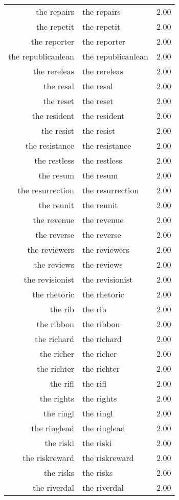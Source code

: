 \begin{table}[ht]
\begin{tabular}{rlr}
  the repairs & the repairs & 2.00 \\ 
  the repetit & the repetit & 2.00 \\ 
  the reporter & the reporter & 2.00 \\ 
  the republicanlean & the republicanlean & 2.00 \\ 
  the rereleas & the rereleas & 2.00 \\ 
  the resal & the resal & 2.00 \\ 
  the reset & the reset & 2.00 \\ 
  the resident & the resident & 2.00 \\ 
  the resist & the resist & 2.00 \\ 
  the resistance & the resistance & 2.00 \\ 
  the restless & the restless & 2.00 \\ 
  the resum & the resum & 2.00 \\ 
  the resurrection & the resurrection & 2.00 \\ 
  the reunit & the reunit & 2.00 \\ 
  the revenue & the revenue & 2.00 \\ 
  the reverse & the reverse & 2.00 \\ 
  the reviewers & the reviewers & 2.00 \\ 
  the reviews & the reviews & 2.00 \\ 
  the revisionist & the revisionist & 2.00 \\ 
  the rhetoric & the rhetoric & 2.00 \\ 
  the rib & the rib & 2.00 \\ 
  the ribbon & the ribbon & 2.00 \\ 
  the richard & the richard & 2.00 \\ 
  the richer & the richer & 2.00 \\ 
  the richter & the richter & 2.00 \\ 
  the rifl & the rifl & 2.00 \\ 
  the rights & the rights & 2.00 \\ 
  the ringl & the ringl & 2.00 \\ 
  the ringlead & the ringlead & 2.00 \\ 
  the riski & the riski & 2.00 \\ 
  the riskreward & the riskreward & 2.00 \\ 
  the risks & the risks & 2.00 \\ 
  the riverdal & the riverdal & 2.00 \\ 

\end{tabular}
\end{table}
